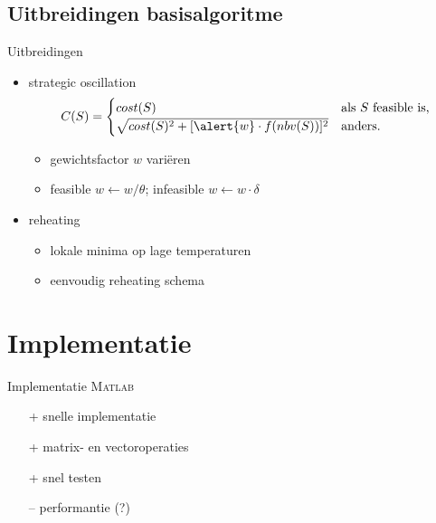 \documentclass{beamer}
\begin{document}



\subsection*{Uitbreidingen basisalgoritme}
\begin{frame}{Uitbreidingen}

\begin{itemize}
 \item<1-4> strategic oscillation
\scriptsize{
\begin{equation*}
  C(S)=%
  \begin{cases}
    cost(S) &\textrm{als $S$ feasible is,} \\
    \sqrt{cost(S)^2 + [\alert{w}\cdot{}f(nbv(S))]^2} &\textrm{anders}.
  \end{cases}
\end{equation*} } \vspace{-0.4cm}
\begin{itemize}
 \item<2-4> gewichtsfactor $w$ vari\"eren
 \item<2-4> feasible $w \leftarrow w/\theta$; infeasible $w \leftarrow w\cdot\delta$
  
\end{itemize}


 \item<3-4> reheating

\begin{itemize}
 \item<4> lokale minima op lage temperaturen
 \item<4> eenvoudig reheating schema
\end{itemize}
\end{itemize}



\end{frame}


\section{Implementatie}
\begin{frame}{Implementatie}
\textsc{Matlab} 
\begin{itemize}
 \item[+] snelle implementatie %
 \item[+] matrix- en vectoroperaties 
 \item[+] snel testen
 \item[--] performantie (?)
\end{itemize}
\end{frame}
\end{document}
